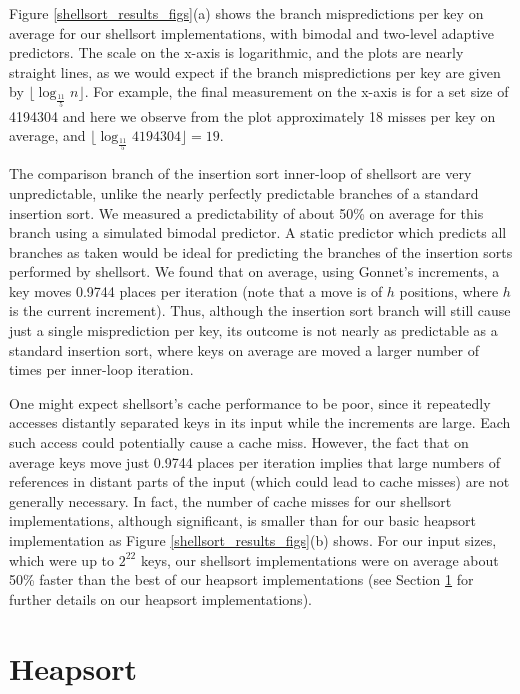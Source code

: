 \documentclass[acmtocl]{acmtrans2m}
\begin{document}
Figure \ref{shellsort_results_figs}(a)
shows the branch mispredictions per key on average for our shellsort
implementations, with bimodal and two-level adaptive predictors.
The scale on the x-axis is logarithmic, and the plots are nearly
straight lines, as we would expect if the branch mispredictions per key
are given by $\lfloor \log_\frac{11}{5} n \rfloor$. For example,
the final measurement on the x-axis is for a set size of 4194304 and
here we observe from the plot approximately 18 misses per key on average,
and $\lfloor \log_\frac{11}{5} 4194304 \rfloor = 19$.

The comparison branch of the insertion sort inner-loop of shellsort are very unpredictable, unlike the 
nearly perfectly predictable branches of a standard insertion sort.
We measured a predictability of about 50\% on average for this branch using a simulated bimodal
predictor.
A static predictor which predicts all branches as taken would be ideal for predicting the branches of the
insertion sorts performed by shellsort.
We found that on average, using Gonnet's increments, a key moves 
0.9744 places per iteration (note that a move is of $h$ positions, 
where $h$ is the current increment). Thus, although the insertion
sort branch will still cause just a single misprediction per key, 
its outcome is not nearly as predictable as a standard insertion
sort, where keys on average are moved a larger number of times
per inner-loop iteration.

One might expect shellsort's cache performance to be poor, since it repeatedly accesses
distantly separated keys in its input while the increments are large. Each such access
could potentially cause a cache miss. However, the fact that on average 
keys move just 0.9744 places per iteration
implies that large numbers of references in distant parts
of the input (which could lead to cache misses) are not generally necessary.
In fact, the number of cache misses for our shellsort implementations, although significant,
is smaller than for our basic heapsort implementation as Figure \ref{shellsort_results_figs}(b)
shows. For our input sizes, which were up to $2^{22}$ keys, our shellsort implementations were on
average about 50\% faster than the best of our heapsort implementations (see Section \ref{heapsort} for
further details on our heapsort implementations).

\section{Heapsort}
\label{heapsort}
\end{document}
